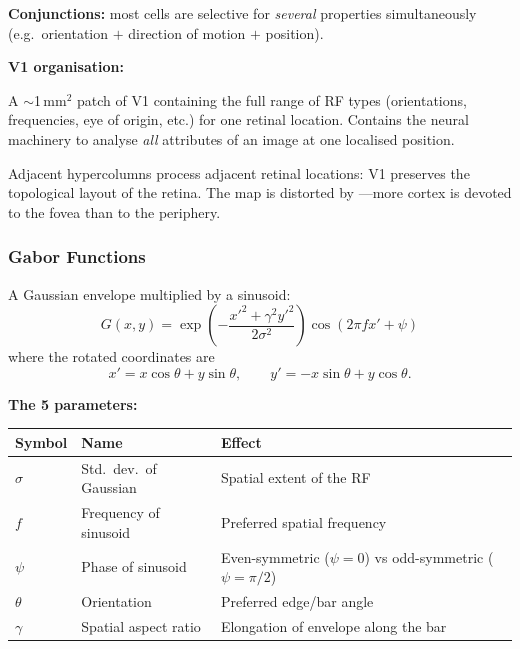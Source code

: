 \textbf{Conjunctions:} most cells are selective for \emph{several} properties simultaneously (e.g.\ orientation $+$ direction of motion $+$ position).

\separator

\textbf{V1 organisation:}

\begin{defbox}[Hypercolumn]
A $\sim$1\,mm$^2$ patch of V1 containing the full range of RF types (orientations, frequencies, eye of origin, etc.) for one retinal location. Contains the neural machinery to analyse \emph{all} attributes of an image at one localised position.
\end{defbox}

\begin{defbox}
Adjacent hypercolumns process adjacent retinal locations: V1 preserves the topological layout of the retina. The map is distorted by ---more cortex is devoted to the fovea than to the periphery.
\end{defbox}

\bigseparator

\subsubsection{Gabor Functions}

\begin{defbox}
A Gaussian envelope multiplied by a sinusoid:
\[
G(x,y) = \exp\!\left(-\frac{x'^2 + \gamma^2 y'^2}{2\sigma^2}\right)\cos(2\pi f x' + \psi)
\]
where the rotated coordinates are
\[
x' = x\cos\theta + y\sin\theta, \qquad y' = -x\sin\theta + y\cos\theta.
\]
\end{defbox}

\textbf{The 5 parameters:}

\begin{center}
\renewcommand{\arraystretch}{1.3}
\begin{tabular}{@{} l l p{8cm} @{}}
\toprule
\textbf{Symbol} & \textbf{Name} & \textbf{Effect} \\
\midrule
$\sigma$ & Std.\ dev.\ of Gaussian & Spatial extent of the RF \\
$f$ & Frequency of sinusoid & Preferred spatial frequency \\
$\psi$ & Phase of sinusoid & Even-symmetric ($\psi=0$) vs odd-symmetric ($\psi=\pi/2$) \\
$\theta$ & Orientation & Preferred edge/bar angle \\
$\gamma$ & Spatial aspect ratio & Elongation of envelope along the bar \\
\bottomrule
\end{tabular}
\end{center}

